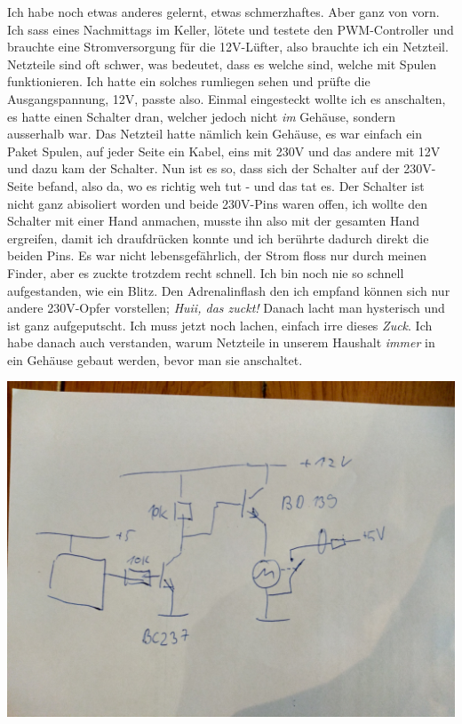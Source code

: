 \documentclass[12pt,titlepage,a4paper]{article}
\begin{document}
Ich habe noch etwas anderes gelernt, etwas schmerzhaftes. Aber ganz von vorn. Ich sass eines Nachmittags im Keller, lötete und testete den PWM-Controller und brauchte eine Stromversorgung für die 12V-Lüfter, also brauchte ich ein Netzteil. Netzteile sind oft schwer, was bedeutet, dass es welche sind, welche mit Spulen funktionieren. Ich hatte ein solches rumliegen sehen und prüfte die Ausgangspannung, 12V, passte also. Einmal eingesteckt wollte ich es anschalten, es hatte einen Schalter dran, welcher jedoch nicht \textit{im} Gehäuse, sondern ausserhalb war. Das Netzteil hatte nämlich kein Gehäuse, es war einfach ein Paket Spulen, auf jeder Seite ein Kabel, eins mit 230V und das andere mit 12V und dazu kam der Schalter. Nun ist es so, dass sich der Schalter auf der 230V-Seite befand, also da, wo es richtig weh tut - und das tat es. Der Schalter ist nicht ganz abisoliert worden und beide 230V-Pins waren offen, ich wollte den Schalter mit einer Hand anmachen, musste ihn also mit der gesamten Hand ergreifen, damit ich draufdrücken konnte und ich berührte dadurch direkt die beiden Pins. Es war nicht lebensgefährlich, der Strom floss nur durch meinen Finder, aber es zuckte trotzdem recht schnell. Ich bin noch nie so schnell aufgestanden, wie ein Blitz. Den Adrenalinflash den ich empfand können sich nur andere 230V-Opfer vorstellen; \textit{Huii, das zuckt!} Danach lacht man hysterisch und ist ganz aufgeputscht. Ich muss jetzt noch lachen, einfach irre dieses \textit{Zuck}. Ich habe danach auch verstanden, warum Netzteile in unserem Haushalt \textit{immer} in ein Gehäuse gebaut werden, bevor man sie anschaltet.


\includegraphics[width=\textwidth, angle=0]{schaltplan}
\end{document}
